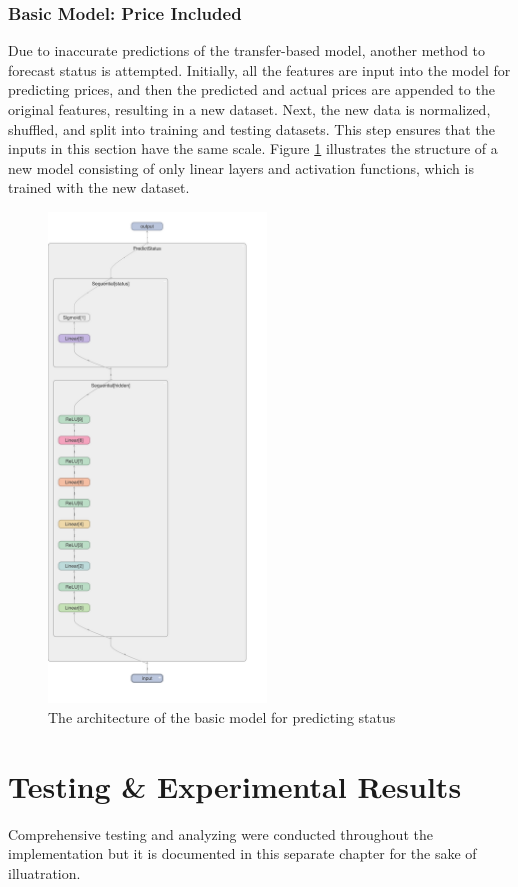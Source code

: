 \documentclass[12pt,twoside]{report}
\begin{document}
\subsection{Basic Model: Price Included}
Due to inaccurate predictions of the transfer-based model, another method to forecast status is attempted. Initially, all the features are input into the model for predicting prices, and then the predicted and actual prices are appended to the original features, resulting in a new dataset. Next, the new data is normalized, shuffled, and split into training and testing datasets. This step ensures that the inputs in this section have the same scale. Figure \ref{basic_status_layout} illustrates the structure of a new model consisting of only linear layers and activation functions, which is trained with the new dataset.

\begin{figure}[!htbp]
	\centering
	\includegraphics[height=13cm]{basic_status_layout}
	\caption{The architecture of the basic model for predicting status}
	\label{basic_status_layout}
\end{figure}

\chapter{Testing \& Experimental Results}
Comprehensive testing and analyzing were conducted throughout the implementation but it is documented in this separate chapter for the sake of illuatration. 
\end{document}
